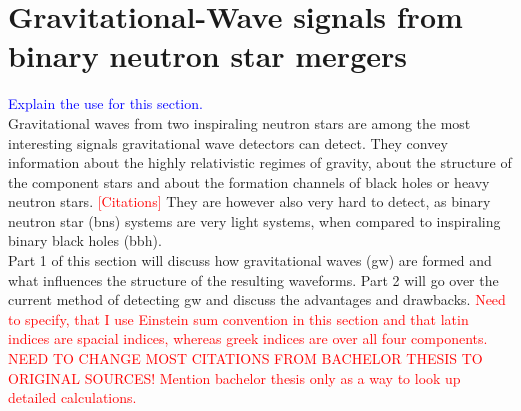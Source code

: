 \section{Gravitational-Wave signals from binary neutron star mergers}
\textcolor{blue}{Explain the use for this section.}\\
Gravitational waves from two inspiraling neutron stars are among the most interesting signals gravitational wave detectors can detect. They convey information about the highly relativistic regimes of gravity, about the structure of the component stars and about the formation channels of black holes or heavy neutron stars. \textcolor{red}{[Citations]} They are however also very hard to detect, as binary neutron star (\gls{bns}) systems are very light systems, when compared to inspiraling binary black holes (\gls{bbh}).\\
Part 1 of this section will discuss how gravitational waves (\gls{gw}) are formed and what influences the structure of the resulting waveforms. Part 2 will go over the current method of detecting \gls{gw} and discuss the advantages and drawbacks. \textcolor{red}{Need to specify, that I use Einstein sum convention in this section and that latin indices are spacial indices, whereas greek indices are over all four components. NEED TO CHANGE MOST CITATIONS FROM BACHELOR THESIS TO ORIGINAL SOURCES! Mention bachelor thesis only as a way to look up detailed calculations.}
